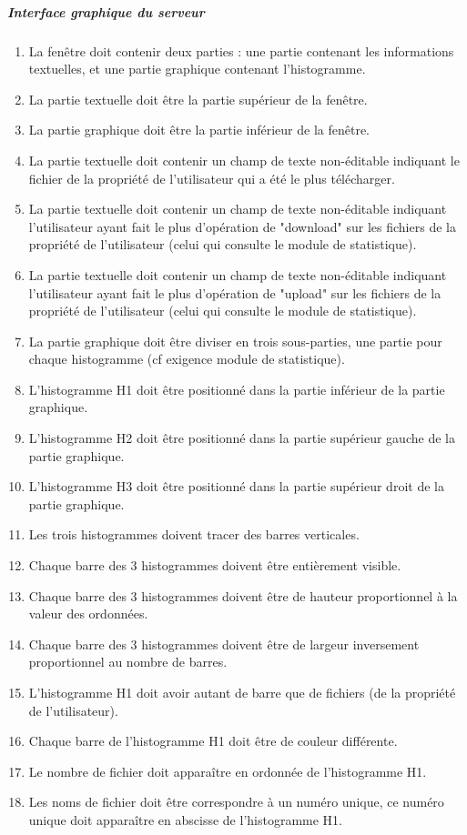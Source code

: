 \documentclass[10pt,a4paper]{report}
\begin{document}
	
	\subparagraph{Interface graphique du serveur}
		\begin{enumerate}
			\item La fenêtre doit contenir deux parties : une partie contenant les informations textuelles, et une partie graphique contenant l'histogramme.
			\item La partie textuelle doit être la partie supérieur de la fenêtre.
			\item La partie graphique doit être la partie inférieur de la fenêtre.
			\item La partie textuelle doit contenir un champ de texte non-éditable indiquant le fichier de la propriété de l'utilisateur qui a été le plus télécharger.
			\item La partie textuelle doit contenir un champ de texte non-éditable indiquant l'utilisateur ayant fait le plus d'opération de "download" sur les fichiers de la propriété de l'utilisateur (celui qui consulte le module de statistique).
			\item La partie textuelle doit contenir un champ de texte non-éditable indiquant l'utilisateur ayant fait le plus d'opération de "upload" sur les fichiers de la propriété de l'utilisateur (celui qui consulte le module de statistique).
			\item La partie graphique doit être diviser en trois sous-parties, une partie pour chaque histogramme (cf exigence module de statistique).
			\item L'histogramme H1 doit être positionné dans la partie inférieur de la partie graphique.
			\item L'histogramme H2 doit être positionné dans la partie supérieur gauche de la partie graphique.
			\item L'histogramme H3 doit être positionné dans la partie supérieur droit de la partie graphique.
			\item Les trois histogrammes doivent tracer des barres verticales.
			\item Chaque barre des 3 histogrammes doivent être entièrement visible.
			\item Chaque barre des 3 histogrammes doivent être de hauteur proportionnel à la valeur des ordonnées.
			\item Chaque barre des 3 histogrammes doivent être de largeur inversement proportionnel au nombre de barres.

			\item L'histogramme H1 doit avoir autant de barre que de fichiers (de la propriété de l'utilisateur).
			\item Chaque barre de l'histogramme H1 doit être de couleur différente.
			\item Le nombre de fichier doit apparaître en ordonnée de l'histogramme H1.
			\item Les noms de fichier doit être correspondre à un numéro unique, ce numéro unique doit apparaître en abscisse de l'histogramme H1.


\end{enumerate}
\end{document}
